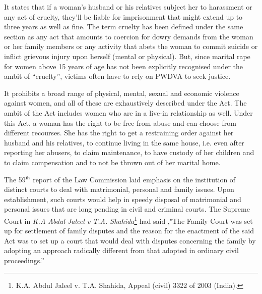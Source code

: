 \begin{multicols}{2}

\vspace{-.15cm}

\noi
It states that if a woman’s husband or his relatives subject her to harassment or any act of
cruelty, they’ll be liable for imprisonment that might extend up to three years as well as fine.
The term cruelty has been defined under the same section as any act that amounts to coercion
for dowry demands from the woman or her family members or any activity that abets the
woman to commit suicide or inflict grievous injury upon herself (mental or physical). But,
since marital rape for women above 15 years of age has not been explicitly recognised under
the ambit of “cruelty”, victims often have to rely on PWDVA to seek justice.

\vspace{-.15cm}


\vspace{-.15cm}

\noi
It prohibits a broad range of physical, mental, sexual and economic violence against women,
and all of these are exhaustively described under the Act. The ambit of the Act includes
women who are in a live-in relationship as well. Under this Act, a woman has the right to be
free from abuse and can choose from different recourses. She has the right to get a restraining
order against her husband and his relatives, to continue living in the same house, i.e. even
after reporting her abusers, to claim maintenance, to have custody of her children and to
claim compensation and to not be thrown out of her marital home.

\vspace{-.15cm}


\vspace{-.15cm}

\noi
The 59$^{\rm th}$ report of the Law Commission laid emphasis on the institution of distinct courts to
deal with matrimonial, personal and family issues. Upon establishment, such courts would
help in speedy disposal of matrimonial and personal issues that are long pending in civil and
criminal courts. The Supreme Court in \textit{K.A Abdul Jaleel v T.A. Shahida}\footnote{K.A. Abdul Jaleel v. T.A. Shahida, Appeal (civil) 3322 of 2003 (India).} had said ,"The
Family Court was set up for settlement of family disputes and the reason for the enactment of
the said Act was to set up a court that would deal with disputes concerning the family
by adopting an approach radically different from that adopted in ordinary civil proceedings.” 


\end{multicols}

